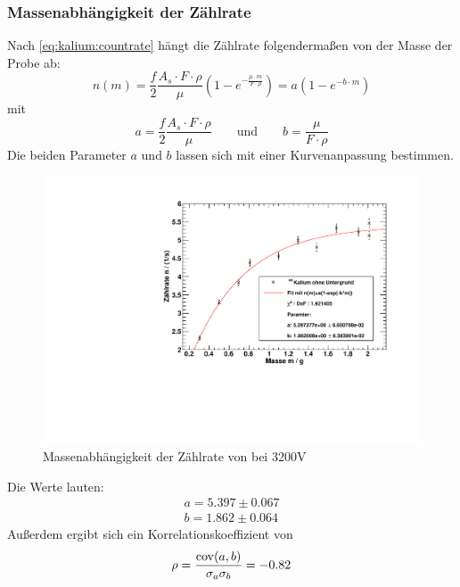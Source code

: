 \subsubsection{Massenabhängigkeit der Zählrate} %
Nach \autoref{eq:kalium:countrate} hängt die Zählrate folgendermaßen von der Masse der Probe ab: %
\begin{equation}
  n(m) = \frac{f}{2} \frac{A_s \cdot F \cdot \rho}{\mu} \left( 1 - e^{- \frac{\mu \cdot m}{F \cdot \rho}} \right) = a(1-e^{-b \cdot m})
\end{equation}
mit
\begin{equation}
  a = \frac{f}{2} \frac{A_s \cdot F \cdot \rho}{\mu} \qquad \text{und} \qquad b = \frac{\mu}{F \cdot \rho}
\end{equation}
Die beiden Parameter $a$ und $b$ lassen sich mit einer Kurvenanpassung bestimmen.
\begin{figure}[H]
\begin{center}
  \includegraphics[width=15cm]{../img/Kalium40_Massenabhaengigkeit.pdf}
  \caption[Massenabhängigkeit der Zählrate von \kalium]{Massenabhängigkeit der Zählrate von \kalium bei 3200V}
  \label{figureLabel}
\end{center}
\end{figure}
Die Werte lauten:
\begin{gather}
  a = 5.397 \pm 0.067 \\ %
  b = 1.862 \pm 0.064
\end{gather}
Außerdem ergibt sich ein Korrelationskoeffizient von
\begin{equation}
  \rho = \frac{\operatorname{cov}(a, b)}{\sigma_a \sigma_b} = -0.82
\end{equation}

